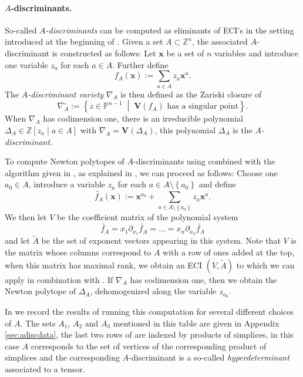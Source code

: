 \documentclass[a4paper]{article}
\theoremstyle{remark}
\newcommand{\set}[1]{\left\{#1\right\}}
\newcommand{\setdes}[2]{\left\{#1\;\middle|\;#2\right\}}
\def\Var{\mathbf{V}}
\def\ZZ{\mathbb{Z}}
\def\PP{\mathbb{P}}
\def\xx{\mathbf{x}}
\begin{document}
\paragraph*{$A$-discriminants.}

So-called {\em $A$-discriminants} \cite{gelfand1994} can be computed
as eliminants of ECI's in the setting introduced at the beginning of
. Given a set $A\subset \ZZ^n$, the associated $A$-discriminant
is constructed as follows: Let $\xx$ be a set of $n$ variables and introduce
one variable $z_a$ for each $a\in A$. Further define
\[f_{A}(\xx) := \sum_{a\in A} z_a\xx^a.\] The {\em $A$-discriminant
  variety} $\nabla_A$ is then defined as the Zariski closure of
\[\nabla_A^{\circ} := \setdes{z\in \PP^{n-1}}{\Var(f_{A})\text{ has a singular
    point}}.\] When $\nabla_A$ has codimension one, there is an irreducible
polynomial $\Delta_A\in \ZZ[z_a\;|\;a\in A]$ with $\nabla_A = \Var(\Delta_A)$, this polynomial
$\Delta_{A}$ is the {\em $A$-discriminant.}

To compute Newton polytopes of $A$-discriminants using
 combined with the algorithm given in
\cite{hugginsIB4eSoftwareFramework2006}, as explained in
, we can proceed as follows: Choose one $a_0\in A$,
introduce a variable $z_a$ for each $a\in A\setminus \set{a_0}$ and define
\[\tilde{f_A}(\xx) := \xx^{a_0} + \sum_{a\in A\setminus \set{a_0}} z_a\xx^a.\]
We then let $V$ be the coefficient matrix of the polynomial system
\[\tilde{f_A} = x_1\partial_{x_1}\tilde{f_A} = \ldots = x_n\partial_{x_n}\tilde{f_A}\]
and let $\tilde{A}$ be the set of exponent vectors appearing in this
system.  Note that $V$ is the matrix whose columns correspond to $A$
with a row of ones added at the top, when this matrix has maximal
rank, we obtain an ECI $(V, \tilde{A})$ to which we can apply
 in combination with
\cite{hugginsIB4eSoftwareFramework2006}. If $\nabla_A$ has codimension one,
then we obtain the Newton polytope of $\Delta_A$, dehomogenized along the
variable $z_{a_0}$.

In  we record the results of running this computation
for several different choices of $A$. The sets $A_1$, $A_2$ and $A_3$
mentioned in this table are given in Appendix \ref{sec:adiscdata}, the
last two rows of  are indexed by products of
simplices, in this case $A$ corresponds to the set of vertices of the
corresponding product of simplices and the corresponding $A$-discriminant
is a so-called {\em hyperdeterminant} associated to a tensor.
\end{document}
